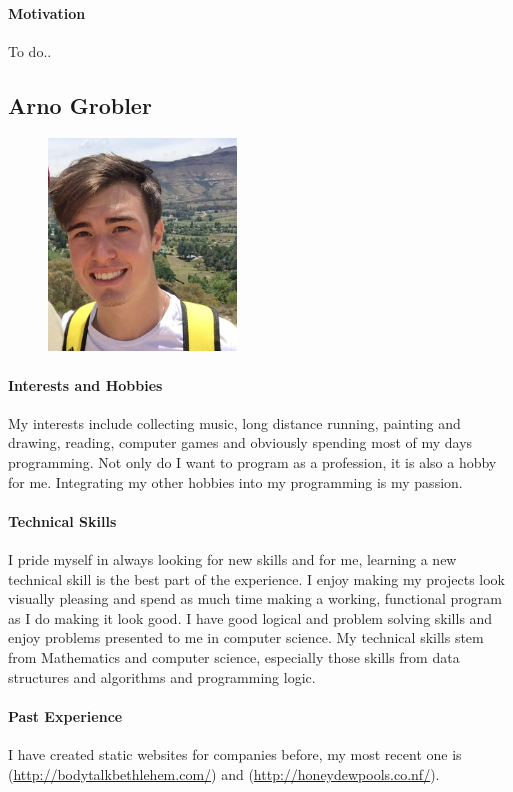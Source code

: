 \documentclass[english]{article}
\begin{document}
			\paragraph{Motivation}
			To do..
		
		\newpage
		\subsection{Arno Grobler}
			\begin{figure}
				\begin{center}
					\includegraphics[width=5cm]{arno.jpg}
				\end{center}
			\end{figure}
			\paragraph{Interests and Hobbies}
			My interests include collecting music, long distance running, painting and drawing, reading, computer games and obviously spending most of my days programming. Not only do I want to program as a profession, it is also a hobby for me. Integrating my other hobbies into my programming is my passion.
			
			\paragraph{Technical Skills}
            I pride myself in always looking for new skills and for me, learning a new technical skill is the best part of the experience. I enjoy making my projects look visually pleasing and spend as much time making a working, functional program as I do making it look good. I have good logical and problem solving skills and enjoy problems presented to me in computer science. My technical skills stem from Mathematics and computer science, especially those skills from data structures and algorithms and programming logic.
			
			\paragraph{Past Experience}
            I have created static websites for companies before, my most recent one is (\href{http://bodytalkbethlehem.com/}{http://bodytalkbethlehem.com/}) and (\href{http://honeydewpools.co.nf/}{http://honeydewpools.co.nf/}).
			
\end{document}
